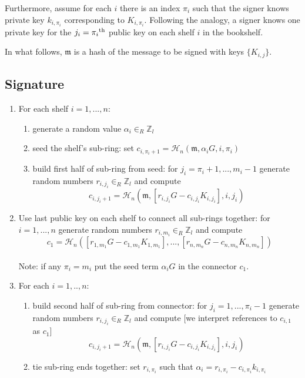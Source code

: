 Furthermore, assume for each $i$ there is an index $\pi_i$ such that the signer knows private key $k_{i,\pi_i}$ corresponding to $K_{i,\pi_i}$. Following the analogy, a signer knows one private key for the $j_i = \pi_i\textsuperscript{th}$ public key on each shelf $i$ in the bookshelf.

In what follows, \(\mathfrak{m}\) is a hash of the message to be signed with keys \(\{ K_{i,j} \} \).

\subsection*{Signature}


\begin{enumerate}
	\item For each shelf \(i = 1, ..., n \):
	\begin{enumerate}
		\item generate a random value \(\alpha_i \in_R \mathbb{Z}_l\)
		
		\item seed the shelf's sub-ring: set \(c_{i, \pi_i+1} = \mathcal{H}_n(\mathfrak{m}, \alpha_i G, i, \pi_i)\)  
           
		
		\item build first half of sub-ring from seed: for \(j_i = \pi_i + 1, ..., m_i-1 \) generate random numbers \(r_{i,j_i} \in_R \mathbb{Z}_l\) and compute\\
		  \[c_{i, j_i+1} = \mathcal{H}_n(\mathfrak{m}, [r_{i,j_i} G - c_{i, j_i} K_{i, j_i}], i, j_i)\]

	\end{enumerate}
	  
	 \item Use last public key on each shelf to connect all sub-rings together: for \(i  = 1, ..., n \) generate random numbers \(r_{i, m_i} \in_R \mathbb{Z}_l\) and compute
	  \[c_1 = \mathcal{H}_n ([r_{1, m_1} G - c_{1,m_1} K_{1, m_1}], ..., [r_{n, m_n} G - c_{n, m_n} K_{n, m_n}])\]\\
	  Note: if any $\pi_i = m_i$ put the seed term $\alpha_i G$ in the connector $c_1$.
	  
	 \item For each \(i = 1, .., n \):
	 
	 \begin{enumerate}
	 	\item build second half of sub-ring from connector: for \(j_i = 1, ..., \pi_i-1 \) generate random numbers \(r_{i, j_i} \in_R \mathbb{Z}_l\) and compute [we interpret references to $c_{i,1}$ as $c_1$]
 	\[c_{i, j_i+1} = \mathcal{H}_n (\mathfrak{m}, [r_{i, j_i} G - c_{i, j_i} K_{i, j_i}], i, j_i)\]
 	  
 	    \item tie sub-ring ends together: set $r_{i, \pi_i}$ such that $\alpha_i = r_{i, \pi_i} - c_{i, \pi_{i}} k_{i, \pi_i}$
	 \end{enumerate} 
 
\end{enumerate}

